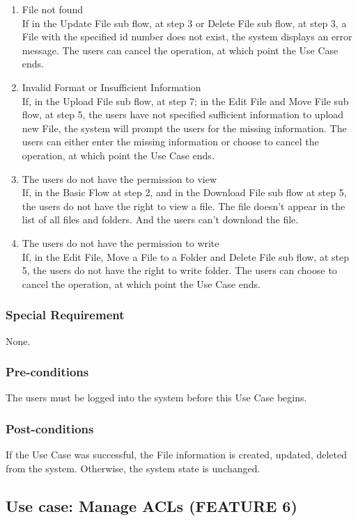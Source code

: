\begin{enumerate}[label=(\roman*)]
    \item File not found \\
If in the Update File sub flow, at step 3 or Delete File sub flow, at step 3, a File with the specified id number does not exist, the system displays an error message. The users can cancel the operation, at which point the Use Case ends.
    \item Invalid Format or Insufficient Information\\
If, in the Upload File sub flow, at step 7; in the Edit File and Move File sub flow, at step 5, the users have not specified sufficient information to upload new File, the system will prompt the users for the missing information. The users can either enter the missing information or choose to cancel the operation, at which point the Use Case ends.
    \item The users do not have the permission to view\\
If, in the Basic Flow at step 2, and in the Download File sub flow at step 5, the users do not have the right to view a file. The file doesn't appear in the list of all files and folders. And the users can't download the file. 
    \item The users do not have the permission to write\\
If, in the Edit File, Move a File to a Folder and Delete File sub flow, at step 5, the users do not have the right to write folder. The users can choose to cancel the operation, at which point the Use Case ends.
\end{enumerate}

\subsubsection{Special Requirement}
None.
\subsubsection{Pre-conditions}
The users must be logged into the system before this Use Case begins.
\subsubsection{Post-conditions}
If the Use Case was successful, the File information is created, updated, deleted from the system. Otherwise, the system state is unchanged.

\subsection{Use case: Manage ACLs (FEATURE 6)}
